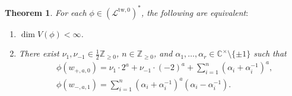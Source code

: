 \documentclass[12pt,a4paper]{amsart}
\newtheorem{thm}{Theorem}[subsection]
\theoremstyle{definition}
\numberwithin{equation}{subsection}
\begin{document}
\begin{thm}\label{thm: classification AI2}
  For each $\phi \in (\mathcal{L}^{\mathrm{tw},0})^*$, the following are equivalent$:$
  \begin{enumerate}
    \item $\dim V(\phi) < \infty$.
    \item There exist $\nu_1,\nu_{-1} \in \frac{1}{2}\mathbb{Z}_{\geq 0}$, $n \in \mathbb{Z}_{\geq 0}$, and $\alpha_1,\dots,\alpha_r \in \mathbb{C}^\times \setminus \{ \pm 1 \}$ such that
    \begin{align*}
      &\phi(w_{+,a,0}) = \nu_1 \cdot 2^a + \nu_{-1} \cdot (-2)^a + \sum_{i=1}^n (\alpha_i+\alpha_i^{-1})^a,\\
      &\phi(w_{-,a,1}) = \sum_{i=1}^n (\alpha_i+\alpha_i^{-1})^a (\alpha_i-\alpha_i^{-1}).
    \end{align*}
  \end{enumerate}
\end{thm}
\end{document}
